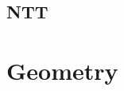\documentclass[a4paper,10pt,twocolumn,oneside]{article}
\begin{document}
%

%

\subsection{NTT}


%

%


\section{Geometry}
%

%
%

%
\end{document}
